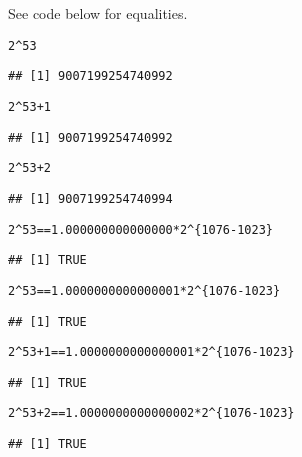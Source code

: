 \documentclass{article}\usepackage[]{graphicx}\usepackage[]{color}
\makeatletter
\newcommand{\hlnum}[1]{\textcolor[rgb]{0.686,0.059,0.569}{#1}}%
\newcommand{\hlopt}[1]{\textcolor[rgb]{0,0,0}{#1}}%
\newcommand{\hlstd}[1]{\textcolor[rgb]{0.345,0.345,0.345}{#1}}%
\newenvironment{kframe}{%
 \def\at@end@of@kframe{}%
 \ifinner\ifhmode%
  \def\at@end@of@kframe{\end{minipage}}%
  \begin{minipage}{\columnwidth}%
 \fi\fi%
 \def\FrameCommand##1{\hskip\@totalleftmargin \hskip-\fboxsep
 \colorbox{shadecolor}{##1}\hskip-\fboxsep
     \hskip-\linewidth \hskip-\@totalleftmargin \hskip\columnwidth}%
 \MakeFramed {\advance\hsize-\width
   \@totalleftmargin\z@ \linewidth\hsize
   \@setminipage}}%
 {\par\unskip\endMakeFramed%
 \at@end@of@kframe}
\newenvironment{knitrout}{}{} %
\makeatother
\begin{document}
See code below for equalities.
\begin{knitrout}
\color{fgcolor}\begin{kframe}
\begin{alltt}
\hlnum{2}\hlopt{^}\hlnum{53}
\end{alltt}
\begin{verbatim}
## [1] 9007199254740992
\end{verbatim}
\begin{alltt}
\hlnum{2}\hlopt{^}\hlnum{53} \hlopt{+} \hlnum{1}
\end{alltt}
\begin{verbatim}
## [1] 9007199254740992
\end{verbatim}
\begin{alltt}
\hlnum{2}\hlopt{^}\hlnum{53} \hlopt{+} \hlnum{2}
\end{alltt}
\begin{verbatim}
## [1] 9007199254740994
\end{verbatim}
\begin{alltt}
\hlnum{2}\hlopt{^}\hlnum{53} \hlopt{==} \hlnum{1.000000000000000} \hlopt{*} \hlnum{2}\hlopt{^}\hlstd{\{}\hlnum{1076}\hlopt{-}\hlnum{1023}\hlstd{\}}
\end{alltt}
\begin{verbatim}
## [1] TRUE
\end{verbatim}
\begin{alltt}
\hlnum{2}\hlopt{^}\hlnum{53} \hlopt{==} \hlnum{1.0000000000000001} \hlopt{*} \hlnum{2}\hlopt{^}\hlstd{\{}\hlnum{1076}\hlopt{-}\hlnum{1023}\hlstd{\}}
\end{alltt}
\begin{verbatim}
## [1] TRUE
\end{verbatim}
\begin{alltt}
\hlnum{2}\hlopt{^}\hlnum{53} \hlopt{+} \hlnum{1} \hlopt{==} \hlnum{1.0000000000000001} \hlopt{*} \hlnum{2}\hlopt{^}\hlstd{\{}\hlnum{1076}\hlopt{-}\hlnum{1023}\hlstd{\}}
\end{alltt}
\begin{verbatim}
## [1] TRUE
\end{verbatim}
\begin{alltt}
\hlnum{2}\hlopt{^}\hlnum{53} \hlopt{+} \hlnum{2} \hlopt{==} \hlnum{1.0000000000000002} \hlopt{*} \hlnum{2}\hlopt{^}\hlstd{\{}\hlnum{1076}\hlopt{-}\hlnum{1023}\hlstd{\}}
\end{alltt}
\begin{verbatim}
## [1] TRUE
\end{verbatim}
\end{kframe}
\end{knitrout}
\end{document}
